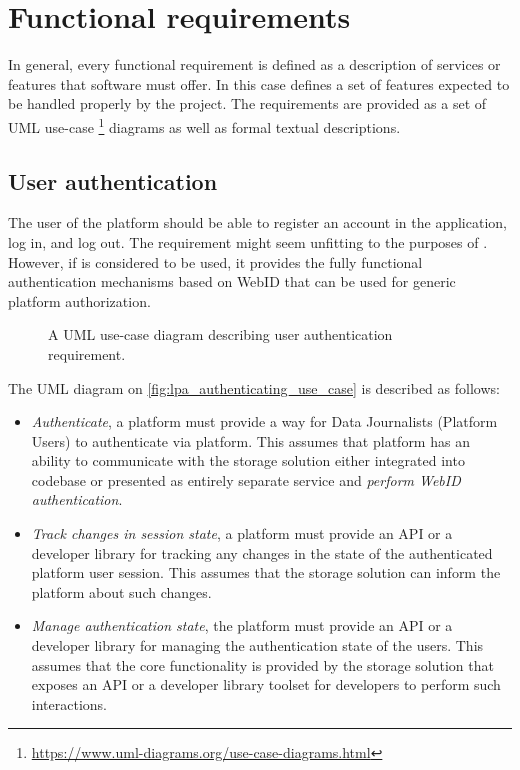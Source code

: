 \section{Functional requirements}

In general, every functional requirement is defined as a description of services or features that software must offer. In this case \lpa{} defines a set of features expected to be handled properly by the \lpas{} project. The requirements are provided as a set of UML use-case \footnote{\url{https://www.uml-diagrams.org/use-case-diagrams.html}} diagrams as well as formal textual descriptions. 

\subsection{User authentication}

The user of the platform should be able to register an account in the application, log in, and log out. The requirement might seem unfitting to the purposes of \lpas{}. However, if \solid{} is considered to be used, it provides the fully functional authentication mechanisms based on WebID that can be used for generic platform authorization.

\begin{figure}[h]
\centering
{}
\caption{A UML use-case diagram describing user authentication requirement.}
\label{fig:lpa_authenticating_use_case}
\end{figure}

The UML diagram on \autoref{fig:lpa_authenticating_use_case} is described as follows:
\begin{itemize}
    \item \textit{Authenticate}, a platform must provide a way for Data Journalists (Platform Users) to authenticate via \lpa{} platform. This assumes that \lpa{} platform has an ability to communicate with the storage solution either integrated into \lpa{} codebase or presented as entirely separate service and \textit{perform WebID authentication}.
    \item \textit{Track changes in session state}, a platform must provide an API or a developer library for tracking any changes in the state of the authenticated platform user session. This assumes that the storage solution can inform the \lpa{} platform about such changes.
    \item \textit{Manage authentication state}, the platform must provide an API or a developer library for managing the authentication state of the users. This assumes that the core functionality is provided by the storage solution that exposes an API or a developer library toolset for developers to perform such interactions.
\end{itemize}

